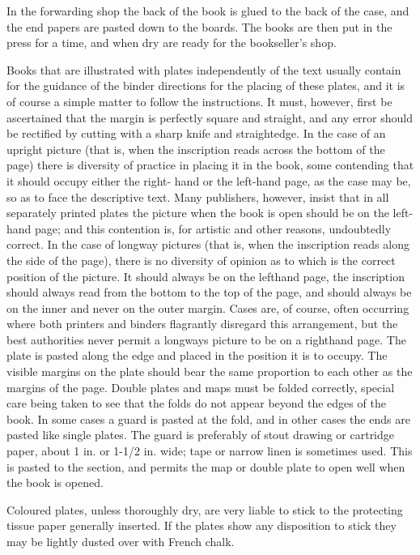 \documentclass[twoside]{book}
\begin{document}
In the forwarding shop the back of the book is
glued to the back of the case, and the end papers
are pasted down to the boards. The books are then
put in the press for a time, and when dry are ready
for the bookseller's shop.

Books that are illustrated with plates independently
of the text usually contain for the guidance
of the binder directions for the placing of these
plates, and it is of course a simple matter to follow
the instructions. It must, however, first be
ascertained that the margin is perfectly square and
straight, and any error should be rectified by
cutting with a sharp knife and straightedge. In the
case of an upright picture (that is, when the
inscription reads across the bottom of the page) there
is diversity of practice in placing it in the book, some
contending that it should occupy either the right-
hand or the left-hand page, as the case may be, so
as to face the descriptive text. Many publishers,
however, insist that in all separately printed plates
the picture when the book is open should be on the
left-hand page; and this contention is, for artistic
and other reasons, undoubtedly correct. In the
case of longway pictures (that is, when the
inscription reads along the side of the page), there is
no diversity of opinion as to which is the correct
\pagebreak
position of the picture. It should always be on the
lefthand page, the inscription should always read from
the bottom to the top of the page, and should
always be on the inner and never on the outer
margin. Cases are, of course, often occurring
where both printers and binders flagrantly
disregard this arrangement, but the best authorities
never permit a longways picture to be on a righthand
page. The plate is pasted along the edge and placed
in the position it is to occupy. The visible
margins on the plate should bear the same proportion
to each other as the margins of the page.
Double plates and maps must be folded correctly,
special care being taken to see that the folds do not
appear beyond the edges of the book. In some
cases a guard is pasted at the fold, and in other
cases the ends are pasted like single plates. The
guard is preferably of stout drawing or cartridge
paper, about 1 in. or 1-1/2 in. wide; tape or narrow
linen is sometimes used. This is pasted to the
section, and permits the map or double plate to
open well when the book is opened.

Coloured plates, unless thoroughly dry, are very
liable to stick to the protecting tissue paper
generally inserted. If the plates show any disposition
to stick they may be lightly dusted over with French
chalk.
\end{document}

